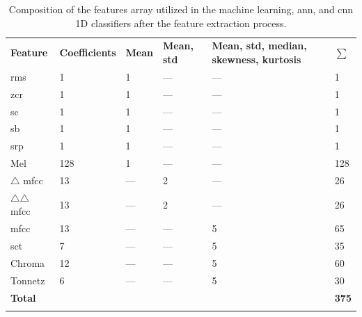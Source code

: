 \begin{table}[ht!]
    \caption[Composition of the first features array]{Composition of the features array utilized in the machine learning, \gls{ann}, and \gls{cnn} 1D classifiers after the feature extraction process.}
    \label{table:features_array_composition}
    \centering
    \begin{tabular}{p{3cm}|p{2.5cm}|p{1.2cm}|p{1.9cm}|p{3.5cm}|p{1.3cm}}
        \Xhline{2\arrayrulewidth} 
        \rowcolor{lightgray}
        \textbf{Feature} & \hfil\textbf{Coefficients} & \hfil\textbf{Mean} & \hfil\textbf{Mean, \gls{std}} & \textbf{Mean, \gls{std}, median, skewness, kurtosis} & \hfil\textbf{$\sum{}$}\\
        \Xhline{2\arrayrulewidth}
        \gls{rms} & \hfil 1 & \hfil 1 & \hfil --- & \hfil --- & \hfil 1 \\
        \gls{zcr} & \hfil 1 & \hfil 1 & \hfil --- & \hfil --- & \hfil 1 \\
        \gls{sc} & \hfil 1 & \hfil 1 & \hfil --- & \hfil --- & \hfil 1 \\
        \gls{sb} & \hfil 1 & \hfil 1 & \hfil --- & \hfil --- & \hfil 1 \\
        \gls{srp} & \hfil 1 & \hfil 1 & \hfil --- & \hfil --- & \hfil 1 \\
        Mel & \hfil 128 & \hfil 1 & \hfil --- & \hfil --- & \hfil 128 \\
        $\triangle$ \gls{mfcc} & \hfil 13 & \hfil --- & \hfil 2 & \hfil --- & \hfil 26 \\
        $\triangle\triangle$ \gls{mfcc} & \hfil 13 & \hfil --- & \hfil 2 & \hfil --- & \hfil 26 \\
        \gls{mfcc} & \hfil 13 & \hfil --- & \hfil --- & \hfil 5 & \hfil 65 \\
        \gls{sct} & \hfil 7 & \hfil --- & \hfil --- & \hfil 5 & \hfil 35 \\
        Chroma & \hfil 12 & \hfil --- & \hfil --- & \hfil 5 & \hfil 60 \\
        Tonnetz & \hfil 6 & \hfil --- & \hfil --- & \hfil 5 & \hfil 30 \\
        \hline       
        \rowcolor{gray!20} 
        \textbf{Total} & \multicolumn{4}{c|}{} & \hfil\textbf{375} \\
        \Xhline{2\arrayrulewidth}
    \end{tabular}
\end{table}


